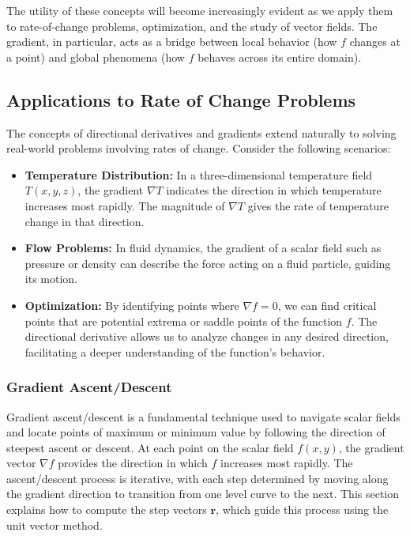 \noindent The utility of these concepts will become increasingly evident as we apply them to rate-of-change problems, optimization, and the study of vector fields. The gradient, in particular, acts as a bridge between local behavior (how \( f \) changes at a point) and global phenomena (how \( f \) behaves across its entire domain).


\subsection*{Applications to Rate of Change Problems} 

\noindent The concepts of directional derivatives and gradients extend naturally to solving real-world problems involving rates of change. Consider the following scenarios:
\begin{itemize}
    \item \textbf{Temperature Distribution:} In a three-dimensional temperature field \( T(x, y, z) \), the gradient \( \nabla T \) indicates the direction in which temperature increases most rapidly. The magnitude of \( \nabla T \) gives the rate of temperature change in that direction.
    \item \textbf{Flow Problems:} In fluid dynamics, the gradient of a scalar field such as pressure or density can describe the force acting on a fluid particle, guiding its motion.
    \item \textbf{Optimization:} By identifying points where \( \nabla f = 0 \), we can find critical points that are potential extrema or saddle points of the function \( f \). The directional derivative allows us to analyze changes in any desired direction, facilitating a deeper understanding of the function's behavior.
\end{itemize}


\subsubsection*{Gradient Ascent/Descent}  

\noindent Gradient ascent/descent is a fundamental technique used to navigate scalar fields and locate points of maximum or minimum value by following the direction of steepest ascent or descent. At each point on the scalar field \( f(x, y) \), the gradient vector \( \nabla f \) provides the direction in which \( f \) increases most rapidly. The ascent/descent process is iterative, with each step determined by moving along the gradient direction to transition from one level curve to the next. This section explains how to compute the step vectors \( \mathbf{r} \), which guide this process using the unit vector method.

